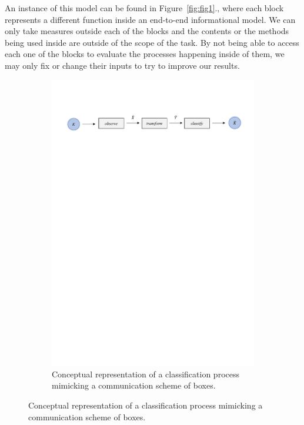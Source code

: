 An instance of this model can be found in Figure~\ref{fig:fig1}., where each block represents a different function inside an end-to-end informational model. We can only take measures outside each of the blocks and the contents or the methods being used inside are outside of the scope of the task. By not being able to access each one of the blocks to evaluate the processes happening inside of them, we may only fix or change their inputs to try to improve our results.
%
\begin{figure}[h]
\begin{subfigure}{1\textwidth}  
 \centering
  \includegraphics[width=16cm]{Figuras_tfg/Figura1_tfg}
  \caption{Conceptual representation of a classification process mimicking a communication scheme of boxes.}
 \label{fig:fig1b} 
\end{subfigure}%


\end{figure}
